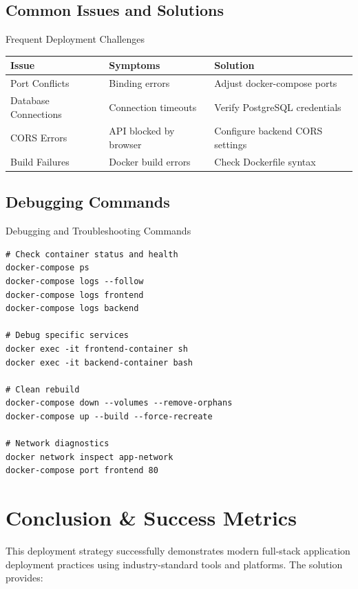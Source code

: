 \documentclass[12pt]{article}
\begin{document}
\subsection{Common Issues and Solutions}
\begin{infobox}{Frequent Deployment Challenges}
\begin{tabular}{|p{4cm}|p{4cm}|>{\raggedright\arraybackslash}p{6cm}|}
\hline
\rowcolor{lightblue}
\textbf{Issue} & \textbf{Symptoms} & \textbf{Solution} \\
\hline
Port Conflicts & Binding errors & Adjust docker-compose ports \\
Database Connections & Connection timeouts & Verify PostgreSQL credentials \\
CORS Errors & API blocked by browser & Configure backend CORS settings \\
Build Failures & Docker build errors & Check Dockerfile syntax \\
\hline
\end{tabular}
\end{infobox}

\subsection{Debugging Commands}
\begin{codebox}{Debugging and Troubleshooting Commands}
\begin{lstlisting}
# Check container status and health
docker-compose ps
docker-compose logs --follow
docker-compose logs frontend
docker-compose logs backend

# Debug specific services
docker exec -it frontend-container sh
docker exec -it backend-container bash

# Clean rebuild
docker-compose down --volumes --remove-orphans
docker-compose up --build --force-recreate

# Network diagnostics
docker network inspect app-network
docker-compose port frontend 80
\end{lstlisting}
\end{codebox}

\section{Conclusion \& Success Metrics}
\begin{successbox}
\textbf{\faCheckCircle} This deployment strategy successfully demonstrates modern full-stack application deployment practices using industry-standard tools and platforms. The solution provides:
\end{successbox}
\end{document}
